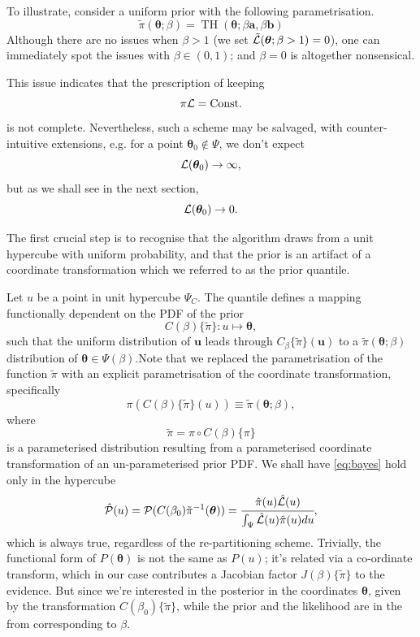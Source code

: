 \documentclass[usenatbib]{mnras}
\DeclareMathOperator{\TopHat}{TH}
\begin{document}
To illustrate, consider a uniform prior with the following
parametrisation.
\begin{equation*}
  \tilde{\pi}(\bm{\theta}; \beta) = \TopHat(\bm{\theta}; \beta \bm{a}, \beta \bm{b})
\end{equation*}
Although there are no issues when \(\beta>1\) (we set
\({\cal\tilde{L}}(\bm{\theta}; \beta>1)=0\)), one can immediately
spot the issues with \(\beta \in (0,1)\); and \(\beta=0\) is
altogether nonsensical.

This issue indicates that the prescription of keeping \[\pi {\cal
	L} = \text{Const.}\] is not complete. Nevertheless, such a scheme
may be salvaged, with counter-intuitive extensions, e.g. for a
point \(\bm{\theta}_{0} \notin \Psi\), we don't expect
\[{\cal L}(\bm{\theta}_{0}) \rightarrow \infty,\] but as we shall see in
the next section, \[{\cal L}(\bm{\theta}_{0}) \rightarrow 0.\]

The first crucial step is to recognise that the algorithm draws
from a unit hypercube with uniform probability, and that the prior
is an artifact of a coordinate transformation which we referred to
as the prior quantile.

Let \(u\) be a point in unit hypercube \(\Psi_{C}\). The quantile
defines a mapping functionally dependent on the PDF of the prior
\[C(\beta)\lbrace \tilde{\pi}\rbrace:u \mapsto \bm{\theta},\] such that
the uniform distribution of \(\bm{u}\) leads through
\(C_{\beta}\{\tilde{\pi}\}(\bm{u})\) to a \(\tilde{\pi}(\bm{\theta};\beta)\)
distribution of \(\bm{\theta} \in\Psi(\beta)\).Note that we replaced the
parametrisation of the function \(\tilde{\pi}\) with an explicit
parametrisation of the coordinate transformation, specifically
\begin{equation*}
  \pi(C(\beta)\{\tilde{\pi}\}(u)) \equiv \tilde{\pi}(\bm{\theta}; \beta),
\end{equation*}
where 
\begin{equation*}
  \tilde{\pi} =  \pi \circ C(\beta) \{ \pi \} 
\end{equation*}
is a parameterised distribution resulting from a parameterised
coordinate transformation of an un-parameterised prior PDF. We shall
have \vref{eq:bayes} hold only in the hypercube
\begin{equation*}
{\cal \hat{P}}(u) = {\cal P}(C(\beta_{0}){\tilde{\pi}}^{-1}(\bm{\theta})) = \cfrac{\hat{\pi} (u) {\cal \hat{L}}(u)}{\int_{\Psi}{\cal \hat{L}}(u) \hat{\pi}(u) du},
\end{equation*}
which is always true, regardless of the re-partitioning
scheme. Trivially, the functional form of \(P(\bm{\theta})\) is not the same
as \(P(u)\); it's related via a co-ordinate transform, which in our
case contributes a Jacobian factor \(J(\beta)\{\tilde{\pi}\}\) to the
evidence. But since we're interested in the posterior in the
coordinates \(\bm{\theta}\), given by the transformation \(C(\beta_{0})\{\tilde{\pi}\}\),
while the prior and the likelihood are in the from corresponding
to \(\beta\).
\end{document}

